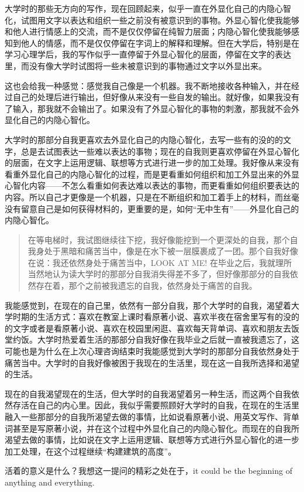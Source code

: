 大学时的那些无方向的写作，现在回顾起来，似乎一直在外显化自己的内隐心智化，试图用文字以表达和组织一些之前没有被意识到的事物。外显心智化使我能够和他人进行情感上的交流，而不是仅仅停留在纯智力层面；内隐心智化使我能够感知到他人的情感，而不是仅仅停留在字词上的解释和理解。但在大学后，特别是在学习心理学后，我的写作似乎一直停留于外显心智化的层面，停留在文字的表达里，而没有像大学时试图将一些未被意识到的事物通过文字以外显出来。

这也会给我一种感觉：感觉我自己像是一个机器。我不断地接收各种输入，并在经过自己的处理后进行输出，但好像从来没有一些自发的输出。就好像，如果我没有了输入，那我就不会输出了。如果没有了外显心智化的事物的刺激，那我就不会外显化自己的内隐心智化。

大学时的那部分自我更喜欢去外显化自己的内隐心智化，去写一些有的没的的文字，总是去试图表达一些难以表达的事物；现在的自我则更喜欢停留在外显心智化的层面，在文字上运用逻辑、联想等方式进行进一步的加工处理。我好像从来没有看重外显化自己的内隐心智化的过程，而是更看重如何组织和加工外显出来的外显心智化内容——不怎么看重如何表达难以表达的事物，而更看重如何组织要表达的内容。所以自己才更像是一个机器，只是在不断组织和加工着手上的材料，而丝毫没有留意自己是如何获得材料的，更重要的是，如何“无中生有”——外显化自己的内隐心智化。

\blockquote{
    在等电梯时，我试图继续往下挖，我好像能挖到一个更深处的自我，那个自我身处于黑暗和痛苦当中，像是在水下被一层膜裹成了一团。那个自我好像在说：我还依然身处于痛苦当中，LOOK AT ME!  在毕业之后，我就理所当然地认为读大学时的那部分自我消失得差不多了，但好像那部分的自我依然存在着，那个之前被我遗忘的自我，依然身处于痛苦的自我。
}

我能感觉到，在现在的自己里，依然有一部分自我，那个大学时的自我，渴望着大学时期的生活方式：喜欢在教室上课时看原著小说、喜欢半夜在宿舍里写有的没的的文字或者是看原著小说、喜欢在校园里闲逛、喜欢每天背单词、喜欢和朋友去饭堂约饭。大学时热爱着生活的那部分自我好像在我毕业之后就一直被我遗忘了，这可能也是为什么在上次心理咨询结束时我能感觉到大学时的那部分自我依然身处于痛苦当中。大学时的自我好像被困于我现在的生活里，现在这一自我所选择和渴望的生活。

现在的自我渴望现在的生活，但大学时的自我渴望着另一种生活，而这两个自我依然存活在自己的内心里。因此，我似乎需要照顾好大学时的自我，在现在的生活里融入一些那部分的自我所渴望去做的事情，比如说看原著小说、用英文写作、背单词甚至是写原著小说，并在这个过程中外显化自己的内隐心智化。而现在的自我所渴望去做的事情，比如说在文字上运用逻辑、联想等方式进行外显心智化的进一步加工处理，在这个过程继续“构建建筑的高度”。


活着的意义是什么？我想这一提问的精彩之处在于，it could be the beginning of anything and everything.
